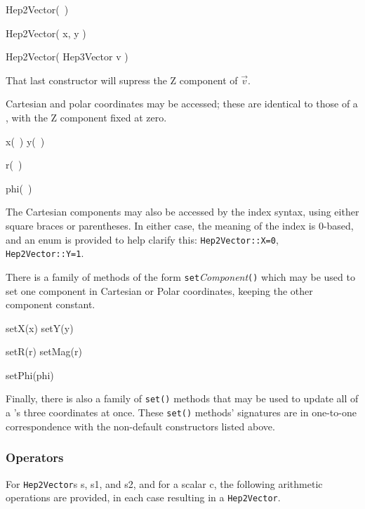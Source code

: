 \begin{shortlist}
  \item Hep2Vector(~)
  \item Hep2Vector( x, y ) 
  \item Hep2Vector( Hep3Vector v ) 
\end{shortlist}

\noindent
That last constructor will supress the Z component of $\vec{v}$.

Cartesian and polar coordinates may be accessed; these are identical to those 
of a \SV, with the Z component fixed at zero.  

\begin{shortlist}
  \item x(~) \/\/\/ y(~) 
  \item r(~) \see{\ref{eq:polar}}
  \item phi(~) \see{\ref{eq:polar}}
\end{shortlist}

\noindent
The Cartesian components may also be accessed by the index syntax, 
using either square braces or parentheses.  
In either case, the meaning of the index is 0-based, 
and an enum is provided to help clarify this: {\tt Hep2Vector::X=0},
{\tt Hep2Vector::Y=1}.

\noindent
There is a family of methods of the form
{\tt set}{\it Component}{\tt ()} which may be used to set 
one component in Cartesian or Polar coordinates, keeping the other
component constant.  

\begin{shortlist}
  \item setX(x) \/\/\/ setY(y) 
  \item setR(r) \/\/\/ setMag(r) \see{\ref{eq:polar}}
  \item setPhi(phi) 		 \see{\ref{eq:polar}}
\end{shortlist}

\noindent
Finally, there is also a family of {\tt set()} methods
that may be used to update all of a \SV 's three coordinates at once.
These {\tt set()} methods' signatures are in one-to-one correspondence
with the non-default constructors listed above.

\subsubsection{Operators}

For {\tt Hep2Vector}s s, s1, and s2, and for a scalar c,
the following arithmetic operations are provided,
in each case resulting in a {\tt Hep2Vector}.

